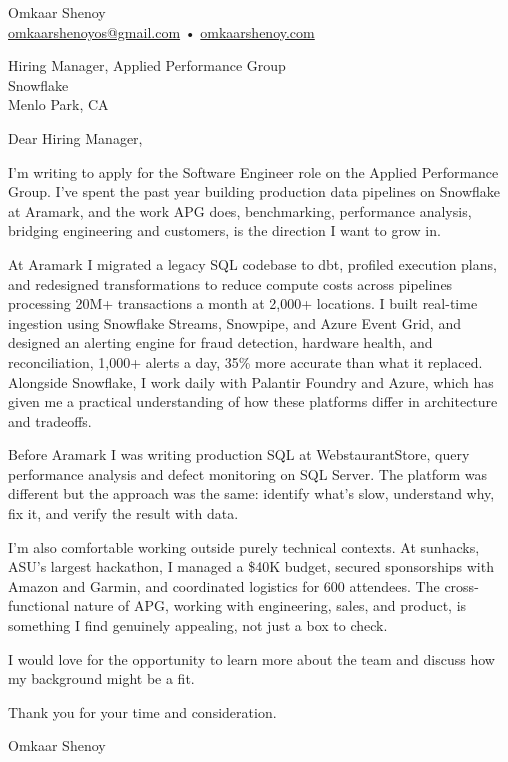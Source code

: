 \documentclass[10pt]{article}
\begin{document}
Omkaar Shenoy \\
\href{mailto:omkaarshenoyos@gmail.com}{omkaarshenoyos@gmail.com} \;•\; \href{https://omkaarshenoy.com}{omkaarshenoy.com}

\vspace{1em}

Hiring Manager, Applied Performance Group \\
Snowflake \\
Menlo Park, CA

\vspace{1.5em}

Dear Hiring Manager,

\vspace{0.8em}

I'm writing to apply for the Software Engineer role on the Applied Performance Group. I've spent the past year building production data pipelines on Snowflake at Aramark, and the work APG does,  benchmarking, performance analysis, bridging engineering and customers,  is the direction I want to grow in.

\vspace{0.8em}

At Aramark I migrated a legacy SQL codebase to dbt, profiled execution plans, and redesigned transformations to reduce compute costs across pipelines processing 20M+ transactions a month at 2,000+ locations. I built real-time ingestion using Snowflake Streams, Snowpipe, and Azure Event Grid, and designed an alerting engine for fraud detection, hardware health, and reconciliation,  1,000+ alerts a day, 35\% more accurate than what it replaced. Alongside Snowflake, I work daily with Palantir Foundry and Azure, which has given me a practical understanding of how these platforms differ in architecture and tradeoffs.

\vspace{0.8em}

Before Aramark I was writing production SQL at WebstaurantStore,  query performance analysis and defect monitoring on SQL Server. The platform was different but the approach was the same: identify what's slow, understand why, fix it, and verify the result with data.

\vspace{0.8em}

I'm also comfortable working outside purely technical contexts. At sunhacks, ASU's largest hackathon, I managed a \$40K budget, secured sponsorships with Amazon and Garmin, and coordinated logistics for 600 attendees. The cross-functional nature of APG,  working with engineering, sales, and product,  is something I find genuinely appealing, not just a box to check.

\vspace{0.8em}

I would love for the opportunity to learn more about the team and discuss how my background might be a fit.

\vspace{1.5em}

Thank you for your time and consideration.

\vspace{1em}

Omkaar Shenoy
\end{document}
